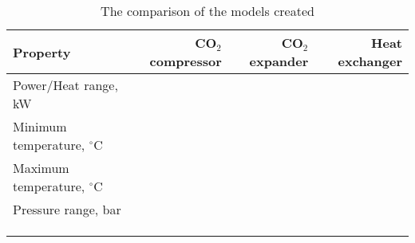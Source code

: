 \begin{table}
\label{tab:DiscussionComparison}
\caption{The comparison of the models created}
\begin{center}
\begin{tabulary}{0.9\textwidth}{LRRR}
\toprule
Property 	&	CO$_2$ compressor & CO$_2$	expander & Heat exchanger \\
\midrule
Power/Heat range, kW& & & \\
Minimum temperature, $^\circ$C& & & \\
Maximum temperature, $^\circ$C& & & \\
Pressure range, bar& & & \\
& & & \\
& & & \\
& & & \\
\bottomrule
\end{tabulary}
\end{center}
\end{table}